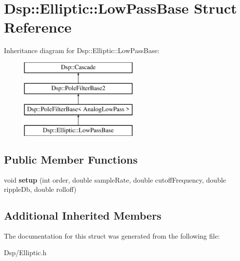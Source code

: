 \hypertarget{structDsp_1_1Elliptic_1_1LowPassBase}{\section{Dsp\-:\-:Elliptic\-:\-:Low\-Pass\-Base Struct Reference}
\label{structDsp_1_1Elliptic_1_1LowPassBase}
}
Inheritance diagram for Dsp\-:\-:Elliptic\-:\-:Low\-Pass\-Base\-:\begin{figure}[H]
\begin{center}
\leavevmode
\includegraphics[height=4.000000cm]{structDsp_1_1Elliptic_1_1LowPassBase}
\end{center}
\end{figure}
\subsection*{Public Member Functions}
\begin{DoxyCompactItemize}
\item 
\hypertarget{structDsp_1_1Elliptic_1_1LowPassBase_a5529d54f6a05896ca62022ec63445a06}{void {\bfseries setup} (int order, double sample\-Rate, double cutoff\-Frequency, double ripple\-Db, double rolloff)}\label{structDsp_1_1Elliptic_1_1LowPassBase_a5529d54f6a05896ca62022ec63445a06}

\end{DoxyCompactItemize}
\subsection*{Additional Inherited Members}


The documentation for this struct was generated from the following file\-:\begin{DoxyCompactItemize}
\item 
Dsp/Elliptic.\-h\end{DoxyCompactItemize}
